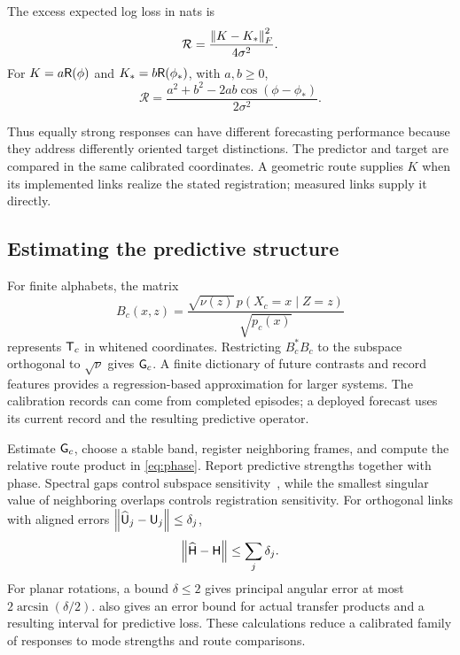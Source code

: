 \begin{proposition}
\label{prop:loss}
The excess expected log loss in nats is
\begin{equation}
\mathcal R=\frac{\left\lVert K-K_*\right\rVert_F^2}{4\sigma^2}.
\label{eq:loss}
\end{equation}
For \(K=a\mathsf R(\phi)\) and \(K_*=b\mathsf R(\phi_*)\), with \(a,b\ge0\),
\begin{equation}
\mathcal R=\frac{a^2+b^2-2ab\cos(\phi-\phi_*)}{2\sigma^2}.
\label{eq:phaseloss}
\end{equation}
\end{proposition}
Thus equally strong responses can have different forecasting performance because they address differently oriented target distinctions. The predictor and target are compared in the same calibrated coordinates. A geometric route supplies \(K\) when its implemented links realize the stated registration; measured links supply it directly.

\subsection{Estimating the predictive structure}
For finite alphabets, the matrix
\begin{equation*}
B_c(x,z)=\frac{\sqrt{\nu(z)}\,p(X_c=x\mid Z=z)}{\sqrt{p_c(x)}}
\end{equation*}
represents \(\mathsf T_c\) in whitened coordinates. Restricting \(B_c^*B_c\) to the subspace orthogonal to \(\sqrt\nu\) gives \(\mathsf G_c\). A finite dictionary of future contrasts and record features provides a regression-based approximation for larger systems. The calibration records can come from completed episodes; a deployed forecast uses its current record and the resulting predictive operator.

Estimate \(\mathsf G_c\), choose a stable band, register neighboring frames, and compute the relative route product in \cref{eq:phase}. Report predictive strengths together with phase. Spectral gaps control subspace sensitivity~\citep{yu2015}, while the smallest singular value of neighboring overlaps controls registration sensitivity. For orthogonal links with aligned errors \(\left\lVert\widehat{\mathsf U}_j-\mathsf U_j\right\rVert\le\delta_j\),
\begin{equation*}
\left\lVert\widehat{\mathsf H}-\mathsf H\right\rVert\le\sum_j\delta_j.
\end{equation*}
For planar rotations, a bound \(\delta\le2\) gives principal angular error at most \(2\arcsin(\delta/2)\).  also gives an error bound for actual transfer products and a resulting interval for predictive loss. These calculations reduce a calibrated family of responses to mode strengths and route comparisons.
